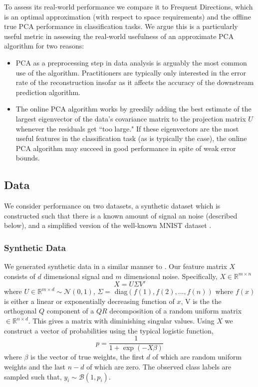 \documentclass[11pt, oneside]{amsart}
\begin{document}
To assess its real-world performance we compare it to Frequent Directions, which is an optimal approximation (with respect to space requirements) and the offline true PCA performance in classification tasks. We argue this is a particularly useful metric in assessing the real-world usefulness of an approximate PCA algorithm for two reasons:
\begin{itemize}
\item PCA as a preprocessing step in data analysis is arguably the most common use of the algorithm. Practitioners are typically only interested in the error rate of the reconstruction insofar as it affects the accuracy of the downstream prediction algorithm.
\item The online PCA algorithm works by greedily adding the best estimate of the largest eigenvector of the data's covariance matrix to the projection matrix $U$ whenever the residuals get ``too large." If these eigenvectors are the most useful features in the classification task (as is typically the case), the online PCA algorithm may succeed in good performance in spite of weak error bounds. 
\end{itemize} 

\subsection{Data}

We consider performance on two datasets, a synthetic dataset which is constructed such that there is a known amount of signal an noise (described below), and a simplified version of the well-known MNIST dataset \cite{mnist}.

\subsubsection{Synthetic Data}
We generated synthetic data in a similar manner to \cite{Liberty2013}. Our feature matrix $X$ consists of $d$ dimensional signal and $m$ dimensional noise. Specifically, $X\in \mathbb{R}^{m\times n}$
\[
X = U \Sigma V'
\]
where $U \in \mathbb{R}^{m\times d}\sim \mathcal{N}(0,1)$, $\Sigma = $ diag$(f(1), f(2), ..., f(n))$ where $f(x)$ is either a linear or exponentially decreasing function of $x$, V is the the orthogonal $Q$ component of a $QR$ decomposition of a random uniform matrix $\in \mathbb{R}^{n\times d}$. This gives a matrix with diminishing singular values. Using $X$ we construct a vector of probabilities using the typical logistic function,
\[
p = \frac{1}{1+ \exp(-X\beta)}
\]
where $\beta$ is the vector of true weights, the first $d$ of which are random uniform weights and the last $n-d$ of which are zero. The observed class labels are sampled such that, $y_i \sim \mathcal{B}(1, p_i)$.
\end{document}
